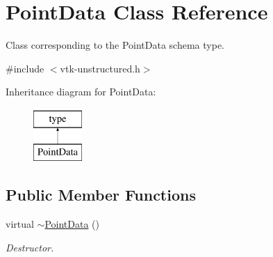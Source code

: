 \hypertarget{classPointData}{}\section{Point\+Data Class Reference}
\label{classPointData}


Class corresponding to the Point\+Data schema type.  




{\ttfamily \#include $<$vtk-\/unstructured.\+h$>$}

Inheritance diagram for Point\+Data\+:\begin{figure}[H]
\begin{center}
\leavevmode
\includegraphics[height=2.000000cm]{classPointData}
\end{center}
\end{figure}
\subsection*{Public Member Functions}
\begin{DoxyCompactItemize}
\item 
virtual \hyperlink{classPointData_a53f701fd5abdb6105900c13f8282305e}{$\sim$\+Point\+Data} ()
\begin{DoxyCompactList}\small\item\em Destructor. \end{DoxyCompactList}\end{DoxyCompactItemize}
